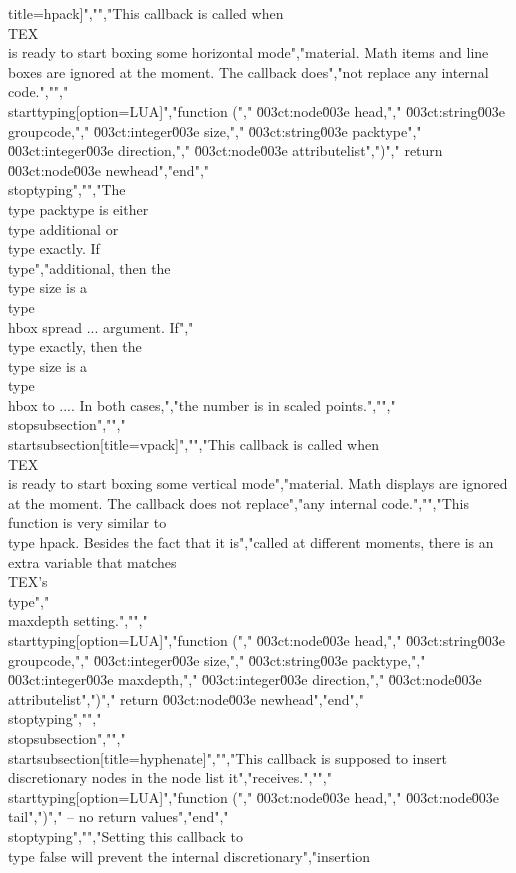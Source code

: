 title=hpack]","","This callback is called when \\TEX\\ is ready to start boxing some horizontal mode","material. Math items and line boxes are ignored at the moment. The callback does","not replace any internal code.","","\\starttyping[option=LUA]","function (","    \u003ct:node\u003e    head,","    \u003ct:string\u003e  groupcode,","    \u003ct:integer\u003e size,","    \u003ct:string\u003e  packtype","    \u003ct:integer\u003e direction,","    \u003ct:node\u003e    attributelist",")","    return \u003ct:node\u003e newhead","end","\\stoptyping","","The \\type {packtype} is either \\type {additional} or \\type {exactly}. If \\type","{additional}, then the \\type {size} is a \\type {\\hbox spread ...} argument. If","\\type {exactly}, then the \\type {size} is a \\type {\\hbox to ...}. In both cases,","the number is in scaled points.","","\\stopsubsection","","\\startsubsection[title=vpack]","","This callback is called when \\TEX\\ is ready to start boxing some vertical mode","material. Math displays are ignored at the moment. The callback does not replace","any internal code.","","This function is very similar to \\type {hpack}. Besides the fact that it is","called at different moments, there is an extra variable that matches \\TEX's \\type","{\\maxdepth} setting.","","\\starttyping[option=LUA]","function (","    \u003ct:node\u003e    head,","    \u003ct:string\u003e  groupcode,","    \u003ct:integer\u003e size,","    \u003ct:string\u003e  packtype,","    \u003ct:integer\u003e maxdepth,","    \u003ct:integer\u003e direction,","    \u003ct:node\u003e    attributelist",")","    return \u003ct:node\u003e newhead","end","\\stoptyping","","\\stopsubsection","","\\startsubsection[title=hyphenate]","","This callback is supposed to insert discretionary nodes in the node list it","receives.","","\\starttyping[option=LUA]","function (","    \u003ct:node\u003e head,","    \u003ct:node\u003e tail",")","    -- no return values","end","\\stoptyping","","Setting this callback to \\type {false} will prevent the internal discretionary","insertion 